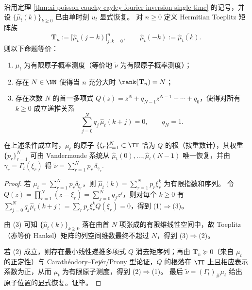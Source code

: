 \begin{proposition}\label{prop:xi-poisson-cauchy-toeplitz-prony-atomic-recovery}
沿用定理 \ref{thm:xi-poisson-cauchy-cayley-fourier-inversion-single-time} 的记号，并设 \(\{\widehat\mu_t(k)\}_{k\ge0}\) 已由单时刻 \(u_t\) 显式恢复。
对 \(n\ge0\) 定义 Hermitian Toeplitz 矩阵族
\[
\mathbf T_n:=\bigl[\widehat\mu_t(j-k)\bigr]_{j,k=0}^{n},
\qquad
\widehat\mu_t(-k):=\overline{\widehat\mu_t(k)}.
\]
则以下命题等价：
\begin{enumerate}
  \item \(\mu_t\) 为有限原子概率测度（等价地 \(\tilde\nu\) 为有限原子概率测度）；
  \item 存在 \(N\in\NN\) 使得当 \(n\) 充分大时 \(\rank(\mathbf T_n)=N\)；
  \item 存在次数 \(N\) 的首一多项式 \(Q(z)=z^N+q_{N-1}z^{N-1}+\cdots+q_0\)，使得对所有 \(k\ge0\) 成立递推关系
  \[
  \sum_{j=0}^{N}q_j\,\widehat\mu_t(k+j)=0,\qquad q_N=1.
  \]
\end{enumerate}
在上述条件成立时，\(\mu_t\) 的原子 \(\{\xi_r\}_{r=1}^{N}\subset\TT\) 恰为 \(Q\) 的根（按重数计），其权重 \(\{p_r\}_{r=1}^{N}\) 可由 Vandermonde 系统从 \(\widehat\mu_t(0),\dots,\widehat\mu_t(N-1)\) 唯一恢复，并由 \(\gamma_r=\Gamma_t(\xi_r)\) 得
\(
\tilde\nu=\sum_{r=1}^{N}p_r\,\delta_{\gamma_r}.
\)
\end{proposition}
\begin{proof}
若 \(\mu_t=\sum_{r=1}^{N}p_r\delta_{\xi_r}\)，则 \(\widehat\mu_t(k)=\sum_{r=1}^{N}p_r\xi_r^{k}\) 为有限指数和序列。
令 \(Q(z)=\prod_{r=1}^{N}(z-\xi_r)=\sum_{j=0}^{N}q_jz^j\)，则对每个 \(k\ge0\) 有
\(
\sum_{j=0}^{N}q_j\widehat\mu_t(k+j)=\sum_{r}p_r\xi_r^{k}Q(\xi_r)=0
\)，得到 (1)\(\Rightarrow\)(3)。
\par
由 (3) 可知 \(\{\widehat\mu_t(k)\}_{k\ge0}\) 落在由首 \(N\) 项张成的有限维线性空间中，故 Toeplitz（亦等价 Hankel）矩阵的列空间维数最终不超过 \(N\)，得到 (3)\(\Rightarrow\)(2)。
\par
若 (2) 成立，则存在最小线性递推多项式 \(Q\) 消去矩序列；再由 \(\mathbf T_n\succeq0\)（来自 \(\mu_t\) 的正定性）与 Carath\'eodory--Fej\'er/Prony 型论证，\(Q\) 的根落在 \(\TT\) 上且相应表示系数为正，从而 \(\mu_t\) 为有限原子测度，得到 (2)\(\Rightarrow\)(1)。
最后 \(\tilde\nu=(\Gamma_t)_\#\mu_t\) 给出原子位置的显式恢复。证毕。
\end{proof}

